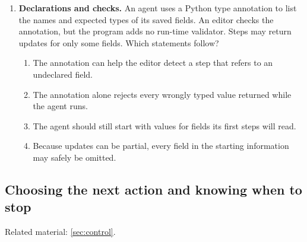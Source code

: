 \begin{enumerate}[start=11,itemsep=0.7\baselineskip]
\item\label{exercise:20} \begin{minipage}[t]{\linewidth}
\textbf{Declarations and checks.} An agent uses a Python type annotation to list the names and expected types of its saved fields. An editor checks the annotation, but the program adds no run-time validator. Steps may return updates for only some fields. Which statements follow?
\begin{enumerate}[label=\textnormal{(\Alph*)},leftmargin=*,itemsep=0pt]
\item The annotation can help the editor detect a step that refers to an undeclared field.
\item The annotation alone rejects every wrongly typed value returned while the agent runs.
\item The agent should still start with values for fields its first steps will read.
\item Because updates can be partial, every field in the starting information may safely be omitted.
\end{enumerate}
\end{minipage}

\end{enumerate}

\subsection{Choosing the next action and knowing when to stop}
\noindent Related material: \cref{sec:control}.

